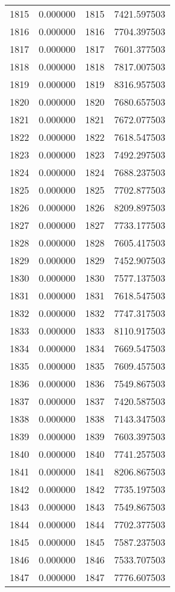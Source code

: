\documentclass[12pt]{article}
\begin{document}
\begin{longtable}{@{}cccc@{}}
1815 & 0.000000 & 1815 & 7421.597503 \\
1816 & 0.000000 & 1816 & 7704.397503 \\
1817 & 0.000000 & 1817 & 7601.377503 \\
1818 & 0.000000 & 1818 & 7817.007503 \\
1819 & 0.000000 & 1819 & 8316.957503 \\
1820 & 0.000000 & 1820 & 7680.657503 \\
1821 & 0.000000 & 1821 & 7672.077503 \\
1822 & 0.000000 & 1822 & 7618.547503 \\
1823 & 0.000000 & 1823 & 7492.297503 \\
1824 & 0.000000 & 1824 & 7688.237503 \\
1825 & 0.000000 & 1825 & 7702.877503 \\
1826 & 0.000000 & 1826 & 8209.897503 \\
1827 & 0.000000 & 1827 & 7733.177503 \\
1828 & 0.000000 & 1828 & 7605.417503 \\
1829 & 0.000000 & 1829 & 7452.907503 \\
1830 & 0.000000 & 1830 & 7577.137503 \\
1831 & 0.000000 & 1831 & 7618.547503 \\
1832 & 0.000000 & 1832 & 7747.317503 \\
1833 & 0.000000 & 1833 & 8110.917503 \\
1834 & 0.000000 & 1834 & 7669.547503 \\
1835 & 0.000000 & 1835 & 7609.457503 \\
1836 & 0.000000 & 1836 & 7549.867503 \\
1837 & 0.000000 & 1837 & 7420.587503 \\
1838 & 0.000000 & 1838 & 7143.347503 \\
1839 & 0.000000 & 1839 & 7603.397503 \\
1840 & 0.000000 & 1840 & 7741.257503 \\
1841 & 0.000000 & 1841 & 8206.867503 \\
1842 & 0.000000 & 1842 & 7735.197503 \\
1843 & 0.000000 & 1843 & 7549.867503 \\
1844 & 0.000000 & 1844 & 7702.377503 \\
1845 & 0.000000 & 1845 & 7587.237503 \\
1846 & 0.000000 & 1846 & 7533.707503 \\
1847 & 0.000000 & 1847 & 7776.607503 \\

\end{longtable}
\end{document}
